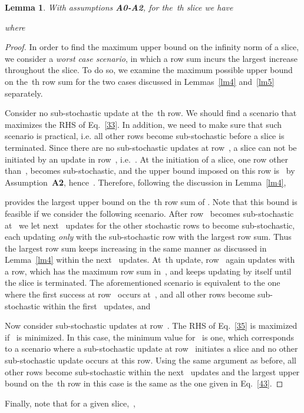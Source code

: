 \documentclass[draftclsnofoot, onecolumn, 12pt]{IEEEtran}
\newtheorem{lem}{Lemma}
\begin{document}
\begin{lem}\label{lm7}
With assumptions {\bf{A0-A2}}, for the~th slice we have

where 

\end{lem}
\begin{proof}
In order to find the maximum upper bound on the infinity norm of a slice, we  consider a \textit{worst case scenario}, in which a row sum incurs the largest increase throughout the slice. To do so, we examine the maximum possible upper bound on the~th row sum for the two cases discussed in Lemmas~\ref{lm4} and~\ref{lm5} separately. 

Consider no sub-stochastic update at the~th row. We should find a scenario that maximizes the RHS of Eq.~\eqref{33}. In addition, we need to make sure that such scenario is practical, i.e. all other rows become sub-stochastic before a slice is terminated. Since there are no sub-stochastic updates at row~, a slice can not be initiated by an update in row~, i.e.~. At the initiation of a slice, one row other than~, becomes sub-stochastic, and the upper bound imposed on this row is~ by Assumption~{\bf{A2}}, hence~. Therefore, following the discussion in Lemma~\ref{lm4},

provides the largest upper bound on the~th row sum of . Note that this bound is feasible if we consider the following scenario. After row~ becomes sub-stochastic at~ we let next~ updates for the other stochastic rows to become sub-stochastic, each updating \textit{only} with the sub-stochastic row with the largest row sum. Thus the largest row sum keeps increasing in the same manner as discussed in Lemma~\ref{lm4} within the next~ updates. At~th update, row~ again updates with a row, which has the maximum row sum in~, and keeps updating by itself until the slice is terminated. The aforementioned scenario is equivalent to the one where the first success at row~ occurs at~, and all other rows become sub-stochastic within the first~ updates, and 


Now consider sub-stochastic updates at row~. The RHS of Eq.~\eqref{35} is maximized if~ is minimized. In this case, the minimum value for~ is one, which corresponds to a scenario where a sub-stochastic update at row~ initiates a slice and no other sub-stochastic update occurs at this row. Using the same argument as before, all other rows become sub-stochastic within the next~ updates and the largest upper bound on the~th row in this case is the same as the one given in Eq.~\eqref{43}.
\end{proof}
Finally, note that for a given slice,~, 
\end{document}
